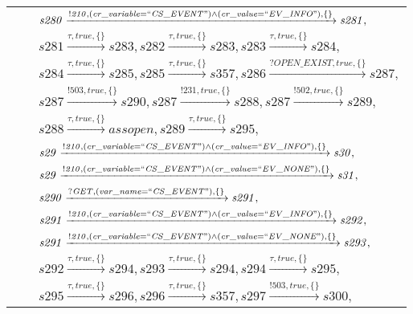 \begin{tabular}{lcl}
& & $\mathit{s280}\xrightarrow{\mathit{!210}, \mathit{(cr\_variable = ``CS\_EVENT") \land (cr\_value = ``EV\_INFO")}, \{\}}\mathit{s281},$ \\
& & $\mathit{s281}\xrightarrow{\mathit{\tau}, \mathit{true}, \{\}}\mathit{s283},\mathit{s282}\xrightarrow{\mathit{\tau}, \mathit{true}, \{\}}\mathit{s283},\mathit{s283}\xrightarrow{\mathit{\tau}, \mathit{true}, \{\}}\mathit{s284},$ \\
& & $\mathit{s284}\xrightarrow{\mathit{\tau}, \mathit{true}, \{\}}\mathit{s285},\mathit{s285}\xrightarrow{\mathit{\tau}, \mathit{true}, \{\}}\mathit{s357},\mathit{s286}\xrightarrow{\mathit{?OPEN\_EXIST}, \mathit{true}, \{\}}\mathit{s287},$ \\
& & $\mathit{s287}\xrightarrow{\mathit{!503}, \mathit{true}, \{\}}\mathit{s290},\mathit{s287}\xrightarrow{\mathit{!231}, \mathit{true}, \{\}}\mathit{s288},\mathit{s287}\xrightarrow{\mathit{!502}, \mathit{true}, \{\}}\mathit{s289},$ \\
& & $\mathit{s288}\xrightarrow{\mathit{\tau}, \mathit{true}, \{\}}\mathit{assopen},\mathit{s289}\xrightarrow{\mathit{\tau}, \mathit{true}, \{\}}\mathit{s295},$ \\
& & $\mathit{s29}\xrightarrow{\mathit{!210}, \mathit{(cr\_variable = ``CS\_EVENT") \land (cr\_value = ``EV\_INFO")}, \{\}}\mathit{s30},$ \\
& & $\mathit{s29}\xrightarrow{\mathit{!210}, \mathit{(cr\_variable = ``CS\_EVENT") \land (cr\_value = ``EV\_NONE")}, \{\}}\mathit{s31},$ \\
& & $\mathit{s290}\xrightarrow{\mathit{?GET}, \mathit{(var\_name = ``CS\_EVENT")}, \{\}}\mathit{s291},$ \\
& & $\mathit{s291}\xrightarrow{\mathit{!210}, \mathit{(cr\_variable = ``CS\_EVENT") \land (cr\_value = ``EV\_INFO")}, \{\}}\mathit{s292},$ \\
& & $\mathit{s291}\xrightarrow{\mathit{!210}, \mathit{(cr\_variable = ``CS\_EVENT") \land (cr\_value = ``EV\_NONE")}, \{\}}\mathit{s293},$ \\
& & $\mathit{s292}\xrightarrow{\mathit{\tau}, \mathit{true}, \{\}}\mathit{s294},\mathit{s293}\xrightarrow{\mathit{\tau}, \mathit{true}, \{\}}\mathit{s294},\mathit{s294}\xrightarrow{\mathit{\tau}, \mathit{true}, \{\}}\mathit{s295},$ \\
& & $\mathit{s295}\xrightarrow{\mathit{\tau}, \mathit{true}, \{\}}\mathit{s296},\mathit{s296}\xrightarrow{\mathit{\tau}, \mathit{true}, \{\}}\mathit{s357},\mathit{s297}\xrightarrow{\mathit{!503}, \mathit{true}, \{\}}\mathit{s300},$ \\

\end{tabular}
